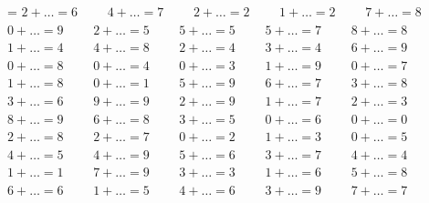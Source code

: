 \pdfpageheight 29.7cm
\pdfpagewidth 21cm
\baselineskip=16pt
\magnification=
\nopagenumbers
\noindent
$ 2 + \ldots = 6 \qquad$
$ 4 + \ldots = 7 \qquad$
$ 2 + \ldots = 2 \qquad$
$ 1 + \ldots = 2 \qquad$
$ 7 + \ldots = 8 \qquad$
$ 0 + \ldots = 9 \qquad$
$ 2 + \ldots = 5 \qquad$
$ 5 + \ldots = 5 \qquad$
$ 5 + \ldots = 7 \qquad$
$ 8 + \ldots = 8 \qquad$
$ 1 + \ldots = 4 \qquad$
$ 4 + \ldots = 8 \qquad$
$ 2 + \ldots = 4 \qquad$
$ 3 + \ldots = 4 \qquad$
$ 6 + \ldots = 9 \qquad$
$ 0 + \ldots = 8 \qquad$
$ 0 + \ldots = 4 \qquad$
$ 0 + \ldots = 3 \qquad$
$ 1 + \ldots = 9 \qquad$
$ 0 + \ldots = 7 \qquad$
$ 1 + \ldots = 8 \qquad$
$ 0 + \ldots = 1 \qquad$
$ 5 + \ldots = 9 \qquad$
$ 6 + \ldots = 7 \qquad$
$ 3 + \ldots = 8 \qquad$
$ 3 + \ldots = 6 \qquad$
$ 9 + \ldots = 9 \qquad$
$ 2 + \ldots = 9 \qquad$
$ 1 + \ldots = 7 \qquad$
$ 2 + \ldots = 3 \qquad$
$ 8 + \ldots = 9 \qquad$
$ 6 + \ldots = 8 \qquad$
$ 3 + \ldots = 5 \qquad$
$ 0 + \ldots = 6 \qquad$
$ 0 + \ldots = 0 \qquad$
$ 2 + \ldots = 8 \qquad$
$ 2 + \ldots = 7 \qquad$
$ 0 + \ldots = 2 \qquad$
$ 1 + \ldots = 3 \qquad$
$ 0 + \ldots = 5 \qquad$
$ 4 + \ldots = 5 \qquad$
$ 4 + \ldots = 9 \qquad$
$ 5 + \ldots = 6 \qquad$
$ 3 + \ldots = 7 \qquad$
$ 4 + \ldots = 4 \qquad$
$ 1 + \ldots = 1 \qquad$
$ 7 + \ldots = 9 \qquad$
$ 3 + \ldots = 3 \qquad$
$ 1 + \ldots = 6 \qquad$
$ 5 + \ldots = 8 \qquad$
$ 6 + \ldots = 6 \qquad$
$ 1 + \ldots = 5 \qquad$
$ 4 + \ldots = 6 \qquad$
$ 3 + \ldots = 9 \qquad$
$ 7 + \ldots = 7 \qquad$



\bye


